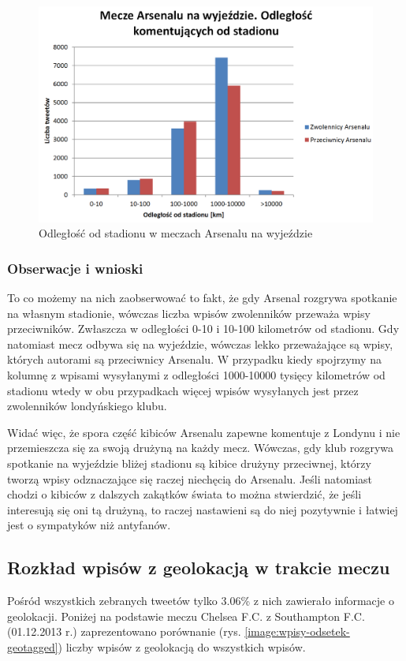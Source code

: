 \clearpage

\begin{figure}[ht!]
\centering
\includegraphics[width=140mm]{img//odleglosc-od-stadionu-away.png}
\caption{Odległość od stadionu w meczach Arsenalu na wyjeździe}
\label{image:odleglosc-od-stadionu-gosc}
\end{figure}

\subsubsection{Obserwacje i wnioski}
To co możemy na nich zaobserwować to fakt, że gdy Arsenal rozgrywa spotkanie na własnym
stadionie, wówczas liczba wpisów zwolenników przeważa wpisy przeciwników.
Zwłaszcza w odległości 0-10 i 10-100 kilometrów od stadionu.
Gdy natomiast mecz odbywa się na wyjeździe, wówczas lekko przeważające
są wpisy, których autorami są przeciwnicy Arsenalu.
W przypadku kiedy spojrzymy na kolumnę z wpisami wysyłanymi z odległości
1000-10000 tysięcy kilometrów od stadionu wtedy w obu przypadkach
więcej wpisów wysyłanych jest przez zwolenników londyńskiego klubu.

Widać więc, że spora część kibiców Arsenalu zapewne komentuje z Londynu
i nie przemieszcza się za swoją drużyną na każdy mecz. Wówczas, gdy klub rozgrywa
spotkanie na wyjeździe bliżej stadionu są kibice drużyny przeciwnej,
którzy tworzą wpisy odznaczające się raczej niechęcią do Arsenalu. 
Jeśli natomiast
chodzi o kibiców z dalszych zakątków świata to można stwierdzić, że
jeśli interesują się oni tą drużyną, to raczej nastawieni są do niej pozytywnie
i łatwiej jest o sympatyków niż antyfanów.


\clearpage
\subsection{Rozkład wpisów z geolokacją w trakcie meczu}
\label{subsection:geowpisy}
Pośród wszystkich zebranych tweetów tylko 3.06\% z nich zawierało informacje o
geolokacji. Poniżej na podstawie meczu Chelsea F.C. z Southampton F.C.
(01.12.2013 r.) zaprezentowano porównanie
(rys. \ref{image:wpisy-odsetek-geotagged}) liczby wpisów z geolokacją do
wszystkich wpisów.


